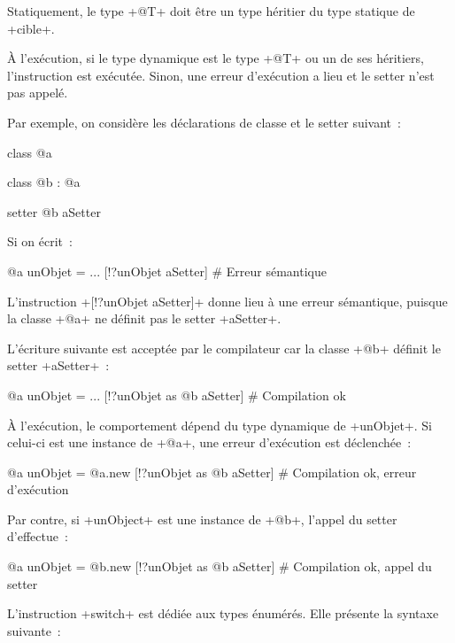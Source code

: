 Statiquement, le type \ggst+@T+ doit être un type héritier du type statique de \ggst+cible+.

À l'exécution, si le type dynamique est le type \ggst+@T+ ou un de ses héritiers, l'instruction est exécutée. Sinon, une erreur d'exécution a lieu et le setter n'est pas appelé.

Par exemple, on considère les déclarations de classe et le setter suivant~:

\begin{galgas3}
class @a { }

class @b : @a { }

setter @b aSetter { }
\end{galgas3}

Si on écrit~:
\begin{galgas3}
@a unObjet = ...
[!?unObjet aSetter] # Erreur sémantique
\end{galgas3}

L'instruction \ggst+[!?unObjet aSetter]+ donne lieu à une erreur sémantique, puisque la classe \ggst+@a+ ne définit pas le setter \ggst+aSetter+.

L'écriture suivante est acceptée par le compilateur car la classe \ggst+@b+ définit le setter \ggst+aSetter+~:
\begin{galgas3}
@a unObjet = ...
[!?unObjet as @b aSetter] # Compilation ok
\end{galgas3}

À l'exécution, le comportement dépend du type dynamique de \ggst+unObjet+. Si celui-ci est une instance de \ggst+@a+, une erreur d'exécution est déclenchée~:
\begin{galgas3}
@a unObjet = @a.new
[!?unObjet as @b aSetter] # Compilation ok, erreur d'exécution
\end{galgas3}


Par contre, si \ggst+unObject+ est une instance de \ggst+@b+, l'appel du setter d'effectue~:
\begin{galgas3}
@a unObjet = @b.new
[!?unObjet as @b aSetter] # Compilation ok, appel du setter
\end{galgas3}











L'instruction \ggst+switch+ est dédiée aux types énumérés. Elle présente la syntaxe suivante~:


